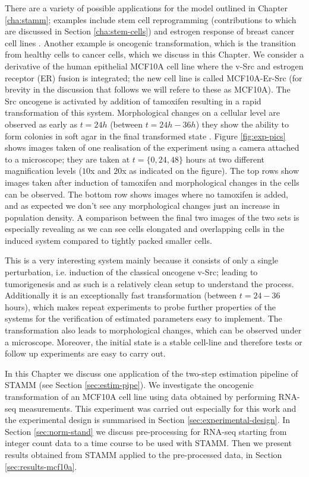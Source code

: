 There are a variety of possible applications for the model outlined in Chapter \ref{cha:stamm}; examples include stem cell reprogramming \citep{Armond:2013} (contributions to which are discussed in Section \ref{cha:stem-cells}) and estrogen response of breast cancer cell lines \citep{Casale:2013}. Another example is oncogenic transformation, which is the transition from healthy cells to cancer cells, which we discuss in this Chapter. We consider a derivative of the human epithelial MCF10A cell line where the v-Src and estrogen receptor (ER) fusion is integrated; the new cell line is called MCF10A-Er-Src \citep{Hirsch:2010ec} (for brevity in the discussion that follows we will refere to these as MCF10A). The Src oncogene is activated by addition of tamoxifen resulting in a rapid transformation of this system. Morphological changes on a cellular level are observed as early as $t=24h$ (between $t=24h-36h$) they show the ability to form colonies in soft agar in the final transformed state \citep{Hirsch:2010ec}. Figure \ref{fig:exp-pics} shows images taken of one realisation of the experiment using a camera attached to a microscope; they are taken at $t= \lbrace 0, 24, 48 \rbrace$ hours at two different magnification levels ($10$x and $20$x as indicated on the figure). The top rows show images taken after induction of tamoxifen and morphological changes in the cells can be observed. The bottom row shows images where no tamoxifen is added, and as expected we don't see any morphological changes just an increase in population density. A comparison between the final two images of the two sets is especially revealing as we can see cells elongated and overlapping cells in the induced system compared to tightly packed smaller cells.

This is a very interesting system mainly because it consists of only a single perturbation, i.e. induction of the classical oncogene v-Src; leading to tumorigenesis and as such is a relatively clean setup to understand the process. Additionally it is an exceptionally fast transformation (between $t=24-36$ hours), which makes repeat experiments to probe further properties of the systems for the verification of estimated parameters easy to implement. The transformation also leads to morphological changes, which can be observed under a microscope. Moreover, the initial state is a stable cell-line and therefore tests or follow up experiments are easy to carry out.

In this Chapter we discuss one application of the two-step estimation pipeline of STAMM (see Section \ref{sec:estim-pipe}). We investigate the oncogenic transformation of an MCF10A cell line using  data obtained by performing RNA-seq measurements. This experiment was carried out especially for this work and the experimental design is summarised in Section \ref{sec:experimental-design}. In Section \ref{sec:norm-stand} we discuss pre-processing for RNA-seq starting from integer count data to a time course to be used with STAMM. Then we present results obtained from STAMM applied to the pre-processed data, in Section \ref{sec:results-mcf10a}.


